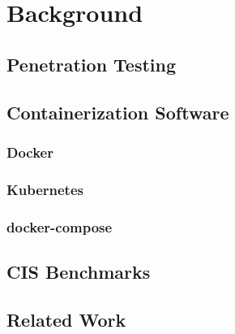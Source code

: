 \chapter{Background}

\section{Penetration Testing}
\section{Containerization Software}
\subsection{Docker}
\subsection{Kubernetes}
\subsection{docker-compose}
\section{CIS Benchmarks}
\section{Related Work}
